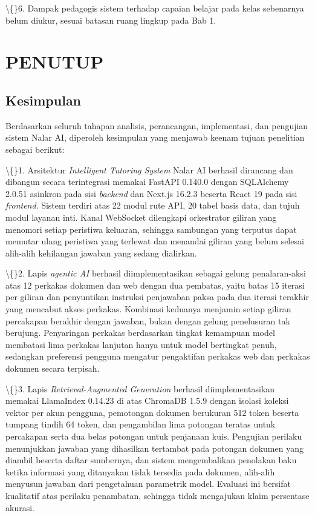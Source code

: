 \documentclass[12pt,a4paper]{article}
\begin{document}
\textbackslash\{\}6. Dampak pedagogis sistem terhadap capaian belajar pada kelas sebenarnya belum diukur, sesuai batasan ruang lingkup pada Bab 1.

\section*{PENUTUP}
\subsection*{Kesimpulan}
Berdasarkan seluruh tahapan analisis, perancangan, implementasi, dan pengujian sistem Nalar AI, diperoleh kesimpulan yang menjawab keenam tujuan penelitian sebagai berikut:

\textbackslash\{\}1. Arsitektur \textit{Intelligent Tutoring System} Nalar AI berhasil dirancang dan dibangun secara terintegrasi memakai FastAPI 0.140.0 dengan SQLAlchemy 2.0.51 asinkron pada sisi \textit{backend} dan Next.js 16.2.3 beserta React 19 pada sisi \textit{frontend}. Sistem terdiri atas 22 modul rute API, 20 tabel basis data, dan tujuh modul layanan inti. Kanal WebSocket dilengkapi orkestrator giliran yang menomori setiap peristiwa keluaran, sehingga sambungan yang terputus dapat memutar ulang peristiwa yang terlewat dan menandai giliran yang belum selesai alih-alih kehilangan jawaban yang sedang dialirkan.

\textbackslash\{\}2. Lapis \textit{agentic AI} berhasil diimplementasikan sebagai gelung penalaran-aksi atas 12 perkakas dokumen dan web dengan dua pembatas, yaitu batas 15 iterasi per giliran dan penyuntikan instruksi penjawaban paksa pada dua iterasi terakhir yang mencabut akses perkakas. Kombinasi keduanya menjamin setiap giliran percakapan berakhir dengan jawaban, bukan dengan gelung penelusuran tak berujung. Penyaringan perkakas berdasarkan tingkat kemampuan model membatasi lima perkakas lanjutan hanya untuk model bertingkat penuh, sedangkan preferensi pengguna mengatur pengaktifan perkakas web dan perkakas dokumen secara terpisah.

\textbackslash\{\}3. Lapis \textit{Retrieval-Augmented Generation} berhasil diimplementasikan memakai LlamaIndex 0.14.23 di atas ChromaDB 1.5.9 dengan isolasi koleksi vektor per akun pengguna, pemotongan dokumen berukuran 512 token beserta tumpang tindih 64 token, dan pengambilan lima potongan teratas untuk percakapan serta dua belas potongan untuk penjanaan kuis. Pengujian perilaku menunjukkan jawaban yang dihasilkan tertambat pada potongan dokumen yang diambil beserta daftar sumbernya, dan sistem mengembalikan penolakan baku ketika informasi yang ditanyakan tidak tersedia pada dokumen, alih-alih menyusun jawaban dari pengetahuan parametrik model. Evaluasi ini bersifat kualitatif atas perilaku penambatan, sehingga tidak mengajukan klaim persentase akurasi.
\end{document}
